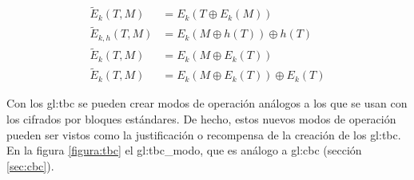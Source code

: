 \begin{align}
  \label{tbc_trivial}
  \tilde{E}_k(T, M) &= E_k(T \oplus E_k(M)) \\
  \label{tbc_lrw}
  \tilde{E}_{k, h}(T, M) &= E_k(M \oplus h(T)) \oplus h(T) \\
  \label{tbc_we}
  \tilde{E}_{k}(T, M) &= E_k(M \oplus E_k(T)) \\
  \label{tbc_xex}
  \tilde{E}_{k}(T, M) &= E_k(M \oplus E_k(T)) \oplus E_k(T)
\end{align}

Con los \gls{gl:tbc} se pueden crear modos de operación análogos a los que se
usan con los cifrados por bloques estándares. De hecho, estos nuevos modos de
operación pueden ser vistos como la justificación o recompensa de la
creación de los \gls{gl:tbc}. En la figura \ref{figura:tbc} el
\gls{gl:tbc_modo}, que es análogo a \gls{gl:cbc} (sección \ref{sec:cbc}).

